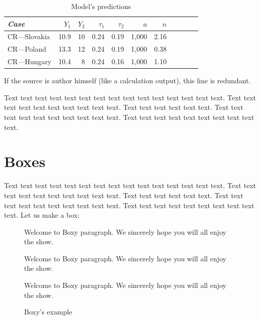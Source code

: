 \begin{table}[!htbp]
\begin{center}
	\caption[Calibration table]{Model's predictions}\label{tab:values}
\begin{tabular}{lrrrrrrrrrr}
\toprule
\textit{Case} &        $Y_1$ &        $Y_2$ &  $\tau_1$ &  $\tau_2$ &          $a$ &          $n$\\
\midrule
CR---Slovakia &       10.9 &         10 &       0.24 &       0.19 &          1,000 &       2.16\\

CR---Poland &       13.3 &         12 &       0.24 &       0.19 &          1,000 &       0.38\\

CR---Hungary &       10.4 &          8 &       0.24 &       0.16 &          1,000 &        1.10\\
\bottomrule
\end{tabular}  
\end{center}
\begin{source} If the source is author himself (like a calculation output), this line is redundant.\end{source}
\end{table}

Text text text text text text text text text text text text text text text. Text text text text text text text text text text. Text text text text text text. Text text text text text text text text text text. Text text text text text text text text text text.

\section{Boxes}

Text text text text text text text text text text text text text text text. Text text text text text text text text text text. Text text text text text text. Text text text text text text text text text text. Text text text text text text text text text text. Let us make a box:

\begin{figure}[!htbp]
\begin{center}
\caption{Boxy's example}\label{box:values}
\begin{boxeditemize}
	\item Welcome to Boxy paragraph. 
We sincerely hope you will
all enjoy the show.
	\item
Welcome to Boxy paragraph.
We sincerely hope you will
all enjoy the show.
	\item 
Welcome to Boxy paragraph.
We sincerely hope you will
all enjoy the show.
\end{boxeditemize}
\end{center}
\begin{source}\cite{Haaparanta1996}\end{source}
\end{figure}

